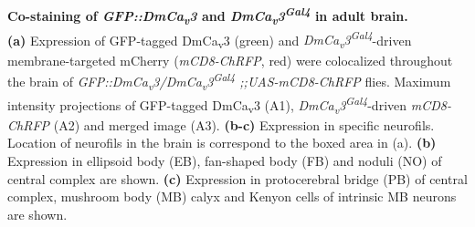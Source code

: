 \label{fig:S1}
\textbf{Co-staining of \emph{GFP::DmCa\textsubscript{v}3} and \emph{DmCa\textsubscript{v}3\textsuperscript{Gal4}} in adult brain.}
\\
\textbf{(a)} Expression of GFP-tagged DmCa\textsubscript{v}3 (green) and \emph{DmCa\textsubscript{v}3\textsuperscript{Gal4}}-driven membrane-targeted mCherry (\emph{mCD8-ChRFP}, red) were colocalized throughout the brain of \emph{GFP::DmCa\textsubscript{v}3/DmCa\textsubscript{v}3\textsuperscript{Gal4} ;;UAS-mCD8-ChRFP} flies.
Maximum intensity projections of GFP-tagged DmCa\textsubscript{v}3 (A1),  \emph{DmCa\textsubscript{v}3\textsuperscript{Gal4}}-driven \emph{mCD8-ChRFP} (A2) and merged image (A3).
\textbf{(b-c)} Expression in specific neurofils. Location of neurofils in the brain is correspond to the boxed area in (a).
\textbf{(b)} Expression in ellipsoid body (EB), fan-shaped body (FB) and noduli (NO) of central complex are shown.
\textbf{(c)} Expression in protocerebral bridge (PB) of central complex, mushroom body (MB) calyx and Kenyon cells of intrinsic MB neurons are shown. 
  